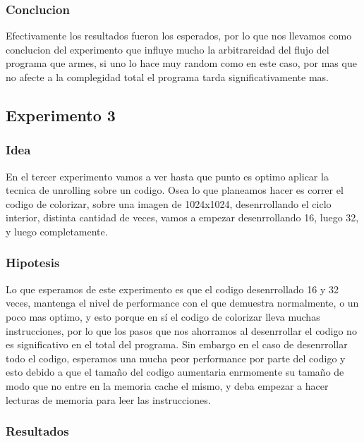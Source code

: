 \medskip

\subsubsection{Conclucion}
Efectivamente los resultados fueron los esperados, por lo que nos llevamos como conclucion del experimento que influye mucho la arbitrareidad del flujo del programa que armes, si uno lo hace muy random como en este caso, por mas que no afecte a la complegidad total el programa tarda significativamente mas.

\subsection{Experimento 3}

\subsubsection{Idea}
En el tercer experimento vamos a ver hasta que punto es optimo aplicar la tecnica de unrolling sobre un codigo. Osea lo que planeamos hacer es correr el codigo de colorizar, sobre una imagen de 1024x1024, desenrrollando el ciclo interior, distinta cantidad de veces, vamos a empezar desenrrollando 16, luego 32, y luego completamente.

	   
\subsubsection{Hipotesis}
Lo que esperamos de este experimento es que el codigo desenrrollado 16 y 32 veces, mantenga el nivel de performance con el que demuestra normalmente, o un poco mas optimo, y esto porque en s\'i el codigo de colorizar lleva muchas instrucciones, por lo que los pasos que nos ahorramos al desenrrollar el codigo no es significativo en el total del programa. Sin embargo en el caso de desenrrollar todo el codigo, esperamos una mucha peor performance por parte del codigo y esto debido a que el tamaño del codigo aumentaria enrmomente su tamaño de modo que no entre en la memoria cache el mismo, y deba empezar a hacer lecturas de memoria para leer las instrucciones.
	
\subsubsection{Resultados}

